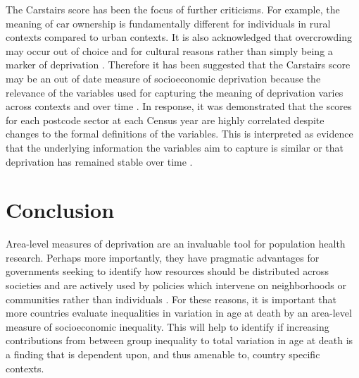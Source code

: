 \documentclass[12pt,oneside,a4paper]{article} %
\theoremstyle{definition}
\begin{document}
The Carstairs score has been the focus of further criticisms. For example, the meaning of car ownership is fundamentally different for individuals in rural contexts compared to urban contexts. It is also acknowledged that overcrowding may occur out of choice and for cultural reasons rather than simply being a marker of deprivation \citep{Fischbacher2014}. Therefore it has been suggested that the Carstairs score may be an out of date measure of socioeconomic deprivation \citep{Schofield2016,Tunstall2011} because the relevance of the variables used for capturing the meaning of deprivation varies across contexts and over time \citep{Norman2010}. In response, it was demonstrated that the scores for each postcode sector at each Census year are highly correlated despite changes to the formal definitions of the variables. This is interpreted as evidence that the underlying information the variables aim to capture is similar or that deprivation has remained stable over time \citep{Leyland2007}.

\section{Conclusion}
Area-level measures of deprivation are an invaluable tool for population health research. Perhaps more importantly, they have pragmatic advantages for governments seeking to identify how resources should be distributed across societies and are actively used by policies which intervene on neighborhoods or communities rather than individuals \citep{Allik2016, Roux2001,Robert1999,TheScottishGovernment2016}. For these reasons, it is important that more countries evaluate inequalities in variation in age at death by an area-level measure of socioeconomic inequality. This will help to identify if increasing contributions from between group inequality to total variation in age at death is a finding that is dependent upon, and thus amenable to, country specific contexts.  




\end{document}
